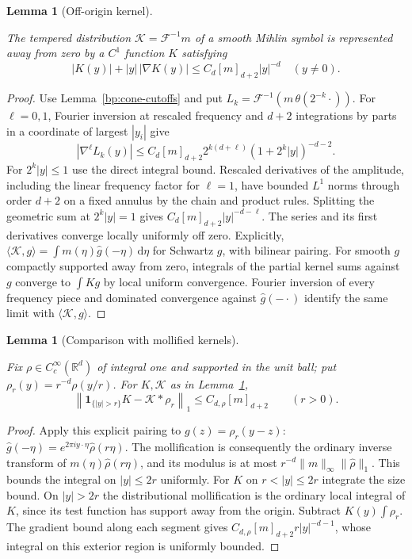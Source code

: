 \documentclass[11pt,letterpaper]{article}
\newtheorem{lemma}[theorem]{Lemma}
\theoremstyle{definition}
\newcommand{\R}{\mathbb R}
\newcommand{\ind}{\mathbf1}
\newcommand{\dd}{\,\mathrm d}
\providecommand{\lean}[1]{}
\providecommand{\uses}[1]{}
\begin{document}
\begin{lemma}[Off-origin kernel]\label{bp:mihlin-kernel}
\lean{TwistedParaproduct.mihlinKernel}
The tempered distribution \(\mathcal K=\mathcal F^{-1}m\) of a
smooth Mihlin symbol is represented away from zero by a \(C^1\)
function \(K\) satisfying
\[
 |K(y)|+|y|\,|\nabla K(y)|\le C_d[m]_{d+2}|y|^{-d}\quad(y\ne0).
\]
\end{lemma}
\begin{proof}
\uses{bp:cone-cutoffs}
Use Lemma~\ref{bp:cone-cutoffs} and put \(L_k=\mathcal F^{-1}
(m\,\theta(2^{-k}\cdot))\). For \(\ell=0,1\), Fourier inversion
at rescaled frequency and \(d+2\) integrations by parts in a
coordinate of largest \(|y_i|\) give
\[
 |\nabla^\ell L_k(y)|\le C_d[m]_{d+2}
 2^{k(d+\ell)}(1+2^k|y|)^{-d-2}.
\]
For \(2^k|y|\le1\) use the direct integral bound. Rescaled
derivatives of the amplitude, including the linear frequency factor
for \(\ell=1\), have bounded \(L^1\) norms through order \(d+2\)
on a fixed annulus by the chain and product rules. Splitting the
geometric sum at \(2^k|y|=1\) gives \(C_d[m]_{d+2}|y|^{-d-\ell}\).
The series and its first derivatives converge locally uniformly off
zero. Explicitly, \(\langle\mathcal K,g\rangle=\int m(\eta)
\widehat g(-\eta)\dd\eta\) for Schwartz \(g\), with bilinear pairing.
For smooth \(g\) compactly supported away from zero, integrals of
the partial kernel sums against \(g\) converge to \(\int Kg\) by
local uniform convergence. Fourier inversion of every frequency
piece and dominated convergence against \(\widehat g(-\cdot)\)
identify the same limit with \(\langle\mathcal K,g\rangle\).
\end{proof}

\begin{lemma}[Comparison with mollified kernels]\label{bp:hard-comparison}
\lean{TwistedParaproduct.hardComparison}
Fix \(\rho\in C_c^\infty(\R^d)\) of integral one and supported in the
unit ball; put \(\rho_r(y)=r^{-d}\rho(y/r)\). For \(K,\mathcal K\)
as in Lemma~\ref{bp:mihlin-kernel},
\[
 \left\|\ind_{\{|y|>r\}}K-\mathcal K*\rho_r\right\|_1
          \le C_{d,\rho}[m]_{d+2}\qquad(r>0).
\]
\end{lemma}
\begin{proof}
\uses{bp:mihlin-kernel}
Apply this explicit pairing to \(g(z)=\rho_r(y-z)\):
\(\widehat g(-\eta)=e^{2\pi i y\cdot\eta}\widehat\rho(r\eta)\).
The mollification is consequently the ordinary inverse transform of
\(m(\eta)\widehat\rho(r\eta)\), and its modulus is at most
\(r^{-d}\|m\|_\infty\|\widehat\rho\|_1\). This bounds the integral
on \(|y|\le2r\) uniformly. For \(K\) on \(r<|y|\le2r\) integrate
the size bound. On \(|y|>2r\) the distributional mollification is
the ordinary local integral of \(K\), since its test function
has support away from the origin. Subtract \(K(y)\int\rho_r\).
The gradient bound along each segment gives
\(C_{d,\rho}[m]_{d+2}r|y|^{-d-1}\), whose integral on this exterior
region is uniformly bounded.
\end{proof}
\end{document}

